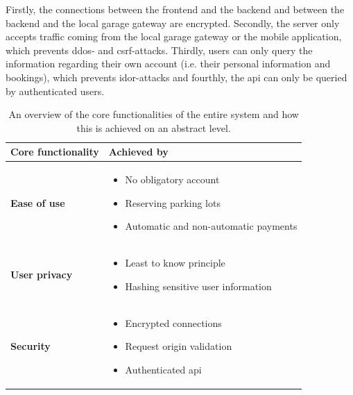 \ind Firstly, the connections between the frontend and the backend and between the backend and the local garage gateway are encrypted. Secondly, the server only accepts traffic coming from the local garage gateway or the mobile application, which prevents \ac{ddos}- and \ac{csrf}-attacks. Thirdly, users can only query the information regarding their own account (i.e. their personal information and bookings), which prevents \ac{idor}-attacks and fourthly, the \ac{api} can only be queried by authenticated users.

\begin{table}[htp]
    \centering
    \caption{An overview of the core functionalities of the entire system and how this is achieved on an abstract level. }
    \begin{tabular}{|>{\bfseries\centering\arraybackslash}m{1in}|>{\centering\arraybackslash}m{8cm}|}
         \hline
         \textbf{Core functionality} & \textbf{Achieved by}  \\
         \hline
         \hline
         Ease of use & \begin{itemize}[left=0pt]
             \item No obligatory account
             \item Reserving parking lots
             \item Automatic and non-automatic payments
         \end{itemize} \\
         \hline
         User privacy & \begin{itemize}[left=0pt]
             \item Least to know principle
             \item Hashing sensitive user information
         \end{itemize}\\
         \hline
         Security &\begin{itemize}[left=0pt]
             \item Encrypted connections
             \item Request origin validation
             \item Authenticated \ac{api}
         \end{itemize} \\
         \hline
    \end{tabular}
    \label{tab:core-functionalities}
\end{table}

\clearpage

